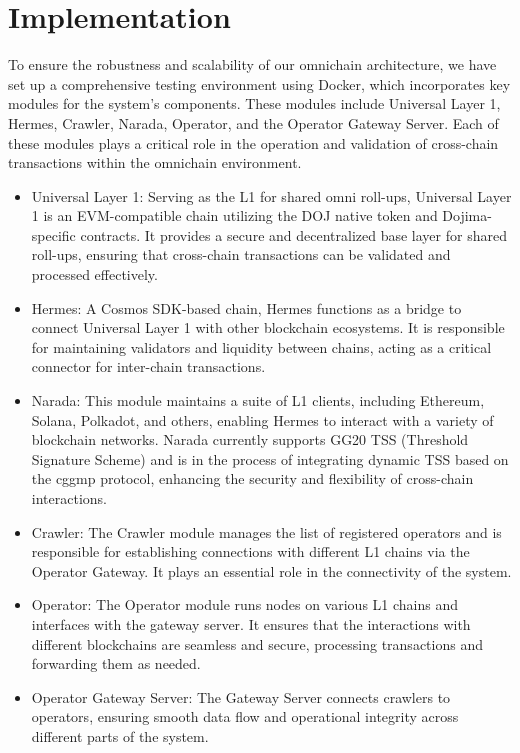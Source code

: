 \section{Implementation}

To ensure the robustness and scalability of our omnichain architecture, we have set up a comprehensive testing environment using Docker, which incorporates key modules for the system’s components. These modules include Universal Layer 1, Hermes, Crawler, Narada, Operator, and the Operator Gateway Server. Each of these modules plays a critical role in the operation and validation of cross-chain transactions within the omnichain environment.

\begin{itemize}
    \item Universal Layer 1: Serving as the L1 for shared omni roll-ups, Universal Layer 1 is an EVM-compatible chain utilizing the DOJ native token and Dojima-specific contracts. It provides a secure and decentralized base layer for shared roll-ups, ensuring that cross-chain transactions can be validated and processed effectively.
  
    \item Hermes: A Cosmos SDK-based chain, Hermes functions as a bridge to connect Universal Layer 1 with other blockchain ecosystems. It is responsible for maintaining validators and liquidity between chains, acting as a critical connector for inter-chain transactions.

    \item Narada: This module maintains a suite of L1 clients, including Ethereum, Solana, Polkadot, and others, enabling Hermes to interact with a variety of blockchain networks. Narada currently supports GG20 TSS (Threshold Signature Scheme) and is in the process of integrating dynamic TSS based on the cggmp protocol, enhancing the security and flexibility of cross-chain interactions.

    \item Crawler: The Crawler module manages the list of registered operators and is responsible for establishing connections with different L1 chains via the Operator Gateway. It plays an essential role in the connectivity of the system.

    \item Operator: The Operator module runs nodes on various L1 chains and interfaces with the gateway server. It ensures that the interactions with different blockchains are seamless and secure, processing transactions and forwarding them as needed.

    \item Operator Gateway Server: The Gateway Server connects crawlers to operators, ensuring smooth data flow and operational integrity across different parts of the system.
\end{itemize}


